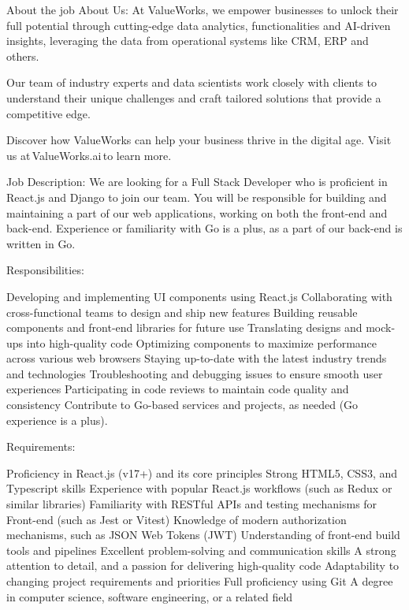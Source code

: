 About the job
About Us: At ValueWorks, we empower businesses to unlock their full potential through cutting-edge data analytics, functionalities and AI-driven insights, leveraging the data from operational systems like CRM, ERP and others. 

 

Our team of industry experts and data scientists work closely with clients to understand their unique challenges and craft tailored solutions that provide a competitive edge. 

Discover how ValueWorks can help your business thrive in the digital age. Visit us at ValueWorks.ai to learn more. 

 

Job Description: We are looking for a Full Stack Developer who is proficient in React.js and Django to join our team. You will be responsible for building and maintaining a part of our web applications, working on both the front-end and back-end. Experience or familiarity with Go is a plus, as a part of our back-end is written in Go. 

 

Responsibilities: 

Developing and implementing UI components using React.js 
Collaborating with cross-functional teams to design and ship new features 
Building reusable components and front-end libraries for future use 
Translating designs and mock-ups into high-quality code 
Optimizing components to maximize performance across various web browsers 
Staying up-to-date with the latest industry trends and technologies 
Troubleshooting and debugging issues to ensure smooth user experiences 
Participating in code reviews to maintain code quality and consistency 
Contribute to Go-based services and projects, as needed (Go experience is a plus). 
 

Requirements: 

Proficiency in React.js (v17+) and its core principles 
Strong HTML5, CSS3, and Typescript skills 
Experience with popular React.js workflows (such as Redux or similar libraries) 
Familiarity with RESTful APIs and testing mechanisms for Front-end (such as Jest or Vitest) 
Knowledge of modern authorization mechanisms, such as JSON Web Tokens (JWT) 
Understanding of front-end build tools and pipelines 
Excellent problem-solving and communication skills 
A strong attention to detail, and a passion for delivering high-quality code 
Adaptability to changing project requirements and priorities 
Full proficiency using Git 
A degree in computer science, software engineering, or a related field 



